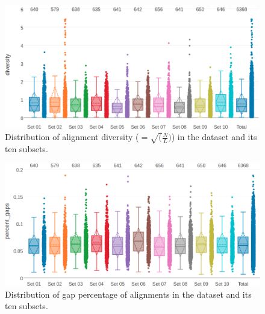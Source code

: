 \documentclass[11pt,a4paper,twoside]{book}
\theoremstyle{definition}
\theoremstyle{definition}
\theoremstyle{remark}
\begin{document}
\begin{figure}

{\centering \includegraphics[width=1\linewidth]{img/dataset_statistics/diversity_dataset_boxplot_notitle} 

}

\caption{Distribution of alignment diversity
(\(=\sqrt(\frac{N}{L})\)) in the dataset and its ten subsets.}\label{fig:dataset-diversity}
\end{figure}




\begin{figure}

{\centering \includegraphics[width=1\linewidth]{img/dataset_statistics/gap_percentage_boxplot_notitle} 

}

\caption{Distribution of gap percentage of alignments in the
dataset and its ten subsets.}\label{fig:dataset-gaps}
\end{figure}
\end{document}
